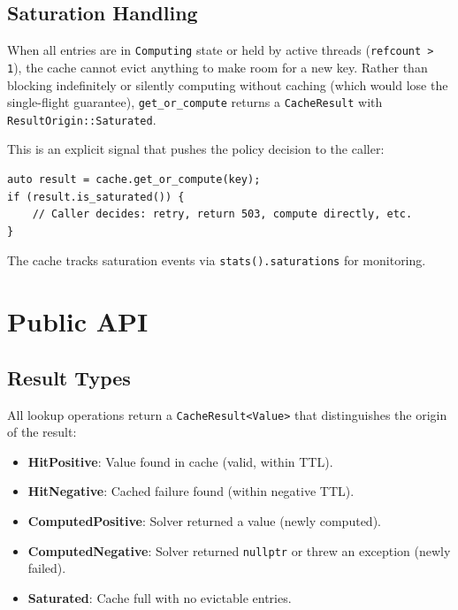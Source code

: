 \documentclass[11pt,a4paper]{article}
\begin{document}
\subsection{Saturation Handling}

When all entries are in \texttt{Computing} state or held by active
threads (\texttt{refcount > 1}), the cache cannot evict anything to make
room for a new key.  Rather than blocking indefinitely or silently
computing without caching (which would lose the single-flight guarantee),
\texttt{get\_or\_compute} returns a \texttt{CacheResult} with
\texttt{ResultOrigin::Saturated}.

This is an explicit signal that pushes the policy decision to the
caller:

\begin{lstlisting}[caption=Explicit saturation handling]
auto result = cache.get_or_compute(key);
if (result.is_saturated()) {
    // Caller decides: retry, return 503, compute directly, etc.
}
\end{lstlisting}

The cache tracks saturation events via \texttt{stats().saturations} for
monitoring.

\section{Public API}
\label{sec:api}

\subsection{Result Types}

All lookup operations return a \texttt{CacheResult<Value>} that
distinguishes the origin of the result:

\begin{itemize}
\item \textbf{HitPositive}: Value found in cache (valid, within TTL).
\item \textbf{HitNegative}: Cached failure found (within negative TTL).
\item \textbf{ComputedPositive}: Solver returned a value (newly computed).
\item \textbf{ComputedNegative}: Solver returned \texttt{nullptr} or
      threw an exception (newly failed).
\item \textbf{Saturated}: Cache full with no evictable entries.
\end{itemize}
\end{document}
